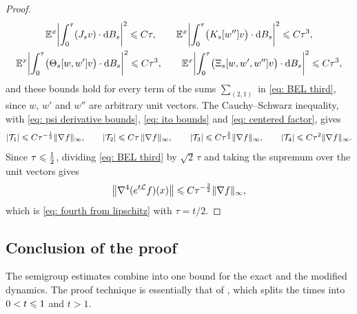 \begin{proof}
\begin{equation}
\begin{gathered}
        \mathbb E^x \biggl| \int_0^\tau (J_s v) \cdot \mathrm{d} B_s \biggr|^2 \leqslant C\tau , \qquad
        \mathbb E^x \biggl| \int_0^\tau \bigl( K_s[w''] v \bigr) \cdot \mathrm{d} B_s \biggr|^2 \leqslant C\tau^3 , \\
        \mathbb E^x \biggl| \int_0^\tau \bigl( \Theta_s[w,w'] v \bigr) \cdot \mathrm{d} B_s \biggr|^2 \leqslant C\tau^3 , \qquad
        \mathbb E^x \biggl| \int_0^\tau \bigl( \Xi_s[w,w',w''] v \bigr) \cdot \mathrm{d} B_s \biggr|^2 \leqslant C\tau^3 ,
    \end{gathered}
    \label{eq: ito bounds}
    \end{equation}
    and these bounds hold for every term of the sums $\sum_{(2,1)}$ in \eqref{eq: BEL third}, since $w$, $w'$ and $w''$ are arbitrary unit vectors. The Cauchy--Schwarz inequality, with \eqref{eq: psi derivative bounds}, \eqref{eq: ito bounds} and \eqref{eq: centered factor}, gives
    \begin{equation*}
        |\mathcal T_1| \leqslant C \tau^{-\frac12} \lVert \nabla f \rVert_\infty , \qquad
        |\mathcal T_2| \leqslant C \tau\, \lVert \nabla f \rVert_\infty , \qquad
        |\mathcal T_3| \leqslant C \tau^{\frac32} \lVert \nabla f \rVert_\infty , \qquad
        |\mathcal T_4| \leqslant C \tau^2 \lVert \nabla f \rVert_\infty .
    \end{equation*}
    Since $\tau \leqslant \frac12$, dividing \eqref{eq: BEL third} by $\sqrt2\, \tau$ and taking the supremum over the unit vectors gives
    \begin{equation*}
        \bigl\| \nabla^4 (e^{t\mathcal L} f)(x) \bigr\| \leqslant C \tau^{-\frac32} \lVert \nabla f \rVert_\infty ,
    \end{equation*}
    which is \eqref{eq: fourth from lipschitz} with $\tau = t/2$.
\end{proof}

\subsection{Conclusion of the proof}
\label{sec: elliptic conclusion}

The semigroup estimates combine into one bound for the exact and the modified dynamics. The proof technique is essentially that of \citep[Lemma~10]{ye2026mse}, which splits the times into $0 < t \leqslant 1$ and $t > 1$.

